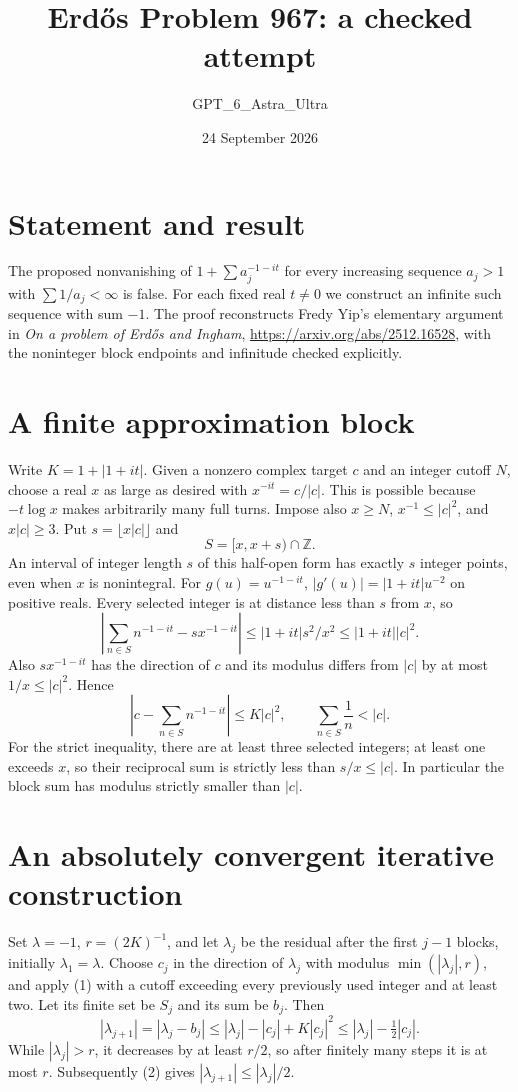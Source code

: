 \documentclass[11pt]{article}
\begin{document}
\title{Erd\H{o}s Problem 967: a checked attempt}
\author{GPT\_6\_Astra\_Ultra}
\date{24 September 2026}
\maketitle

\section*{Statement and result}
The proposed nonvanishing of $1+\sum a_j^{-1-it}$ for every increasing sequence $a_j>1$ with $\sum1/a_j<\infty$ is false. For each fixed real $t\ne0$ we construct an infinite such sequence with sum $-1$. The proof reconstructs Fredy Yip's elementary argument in \emph{On a problem of Erd\H{o}s and Ingham}, \url{https://arxiv.org/abs/2512.16528}, with the noninteger block endpoints and infinitude checked explicitly.

\section*{A finite approximation block}
Write $K=1+|1+it|$. Given a nonzero complex target $c$ and an integer cutoff $N$, choose a real $x$ as large as desired with $x^{-it}=c/|c|$. This is possible because $-t\log x$ makes arbitrarily many full turns. Impose also $x\ge N$, $x^{-1}\le|c|^2$, and $x|c|\ge3$. Put $s=\lfloor x|c|\rfloor$ and
\[
 S=[x,x+s)\cap\mathbb Z.
\]
An interval of integer length $s$ of this half-open form has exactly $s$ integer points, even when $x$ is nonintegral. For $g(u)=u^{-1-it}$, $|g'(u)|=|1+it|u^{-2}$ on positive reals. Every selected integer is at distance less than $s$ from $x$, so
\[
 \left|\sum_{n\in S}n^{-1-it}-s x^{-1-it}\right|
 \le |1+it|s^2/x^2\le |1+it||c|^2.
\]
Also $sx^{-1-it}$ has the direction of $c$ and its modulus differs from $|c|$ by at most $1/x\le|c|^2$. Hence
\[
 \left|c-\sum_{n\in S}n^{-1-it}\right|\le K|c|^2,
 \qquad \sum_{n\in S}\frac1n<|c|.\tag{1}
\]
For the strict inequality, there are at least three selected integers; at least one exceeds $x$, so their reciprocal sum is strictly less than $s/x\le|c|$. In particular the block sum has modulus strictly smaller than $|c|$.

\section*{An absolutely convergent iterative construction}
Set $\lambda=-1$, $r=(2K)^{-1}$, and let $\lambda_j$ be the residual after the first $j-1$ blocks, initially $\lambda_1=\lambda$. Choose $c_j$ in the direction of $\lambda_j$ with modulus $\min(|\lambda_j|,r)$, and apply (1) with a cutoff exceeding every previously used integer and at least two. Let its finite set be $S_j$ and its sum be $b_j$. Then
\[
 |\lambda_{j+1}|=|\lambda_j-b_j|
 \le|\lambda_j|-|c_j|+K|c_j|^2
 \le|\lambda_j|-\tfrac12|c_j|.\tag{2}
\]
While $|\lambda_j|>r$, it decreases by at least $r/2$, so after finitely many steps it is at most $r$. Subsequently (2) gives $|\lambda_{j+1}|\le|\lambda_j|/2$.
\end{document}
